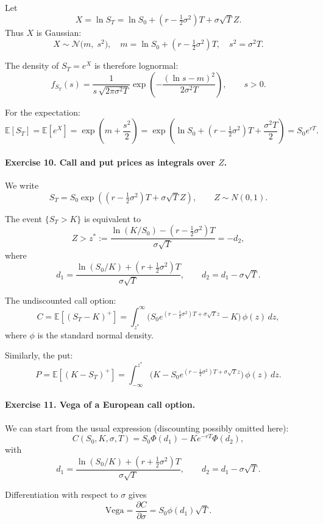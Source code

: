 \documentclass[11pt]{article}
\begin{document}
Let
\[
X=\ln S_T = \ln S_0 + (r-\tfrac12\sigma^2)T + \sigma\sqrt{T}Z.
\]
Thus \(X\) is Gaussian:
\[
X\sim \mathcal{N}\big(m,\;s^2\big),
\quad
m = \ln S_0 + (r-\tfrac12\sigma^2)T,\quad s^2=\sigma^2 T.
\]

The density of \(S_T=e^X\) is therefore lognormal:
\[
f_{S_T}(s)=\frac{1}{s\,\sqrt{2\pi\sigma^2T}}
\exp\left(-\frac{(\ln s - m)^2}{2\sigma^2 T}\right),\qquad s>0.
\]

For the expectation:
\[
\mathbb{E}[S_T] = \mathbb{E}[e^X]
= \exp\left(m+\frac{s^2}{2}\right)
= \exp\left(\ln S_0 + (r-\tfrac12\sigma^2)T + \frac{\sigma^2 T}{2}\right)
= S_0 e^{rT}.
\]

\bigskip

\paragraph{Exercise 10. Call and put prices as integrals over \(Z\).}

We write
\[
S_T = S_0\exp\left((r-\tfrac12\sigma^2)T+\sigma\sqrt{T}Z\right),\qquad Z\sim N(0,1).
\]

The event \(\{S_T>K\}\) is equivalent to
\[
Z > z^\ast
:= \frac{\ln(K/S_0) - (r-\tfrac12\sigma^2)T}{\sigma\sqrt{T}}
= -d_2,
\]
where 
\[
d_1 = \frac{\ln(S_0/K) + (r+\tfrac12\sigma^2)T}{\sigma\sqrt{T}},
\qquad
d_2 = d_1 - \sigma\sqrt{T}.
\]

The undiscounted call option:
\[
C = \mathbb{E}[(S_T-K)^+]
= \int_{z^\ast}^{\infty} \big(S_0 e^{(r-\tfrac12\sigma^2)T+\sigma\sqrt{T}z} - K\big)\,\phi(z)\,dz,
\]
where \(\phi\) is the standard normal density.

Similarly, the put:
\[
P = \mathbb{E}[(K-S_T)^+]
= \int_{-\infty}^{z^\ast} \big(K - S_0 e^{(r-\tfrac12\sigma^2)T+\sigma\sqrt{T}z}\big)\,\phi(z)\,dz.
\]

\bigskip

\paragraph{Exercise 11. Vega of a European call option.}

We can start from the usual expression (discounting possibly omitted here):
\[
C(S_0,K,\sigma,T)=S_0\Phi(d_1)-K e^{-rT}\Phi(d_2),
\]
with
\[
d_1 = \frac{\ln(S_0/K) + (r+\tfrac12\sigma^2)T}{\sigma\sqrt{T}},
\qquad
d_2=d_1-\sigma\sqrt{T}.
\]

Differentiation with respect to \(\sigma\) gives
\[
\text{Vega} = \frac{\partial C}{\partial \sigma}
= S_0\phi(d_1)\sqrt{T}.
\]
\end{document}

